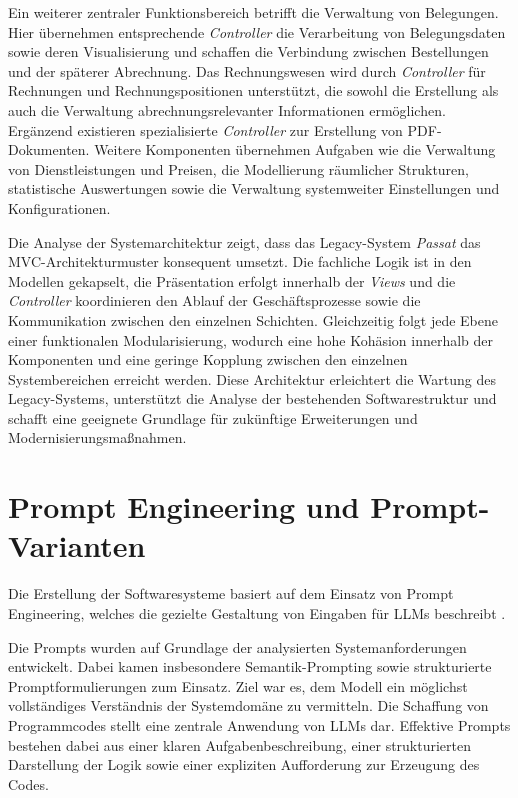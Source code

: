 Ein weiterer zentraler Funktionsbereich betrifft die Verwaltung von Belegungen. Hier übernehmen entsprechende \textit{Controller} die Verarbeitung von Belegungsdaten sowie deren Visualisierung und schaffen die Verbindung zwischen Bestellungen und der späterer Abrechnung. Das Rechnungswesen wird durch \textit{Controller} für Rechnungen und Rechnungspositionen unterstützt, die sowohl die Erstellung als auch die Verwaltung abrechnungsrelevanter Informationen ermöglichen. Ergänzend existieren spezialisierte \textit{Controller} zur Erstellung von PDF-Dokumenten. Weitere Komponenten übernehmen Aufgaben wie die Verwaltung von Dienstleistungen und Preisen, die Modellierung räumlicher Strukturen, statistische Auswertungen sowie die Verwaltung systemweiter Einstellungen und Konfigurationen.

Die Analyse der Systemarchitektur zeigt, dass das Legacy-System \textit{Passat} das MVC-Architekturmuster konsequent umsetzt. Die fachliche Logik ist in den Modellen gekapselt, die Präsentation erfolgt innerhalb der \textit{Views} und die \textit{Controller} koordinieren den Ablauf der Geschäftsprozesse sowie die Kommunikation zwischen den einzelnen Schichten. Gleichzeitig folgt jede Ebene einer funktionalen Modularisierung, wodurch eine hohe Kohäsion innerhalb der Komponenten und eine geringe Kopplung zwischen den einzelnen Systembereichen erreicht werden. Diese Architektur erleichtert die Wartung des Legacy-Systems, unterstützt die Analyse der bestehenden Softwarestruktur und schafft eine geeignete Grundlage für zukünftige Erweiterungen und Modernisierungsmaßnahmen.

\section{Prompt Engineering und Prompt-Varianten}

Die Erstellung der Softwaresysteme basiert auf dem
Einsatz von Prompt Engineering, welches die gezielte
Gestaltung von Eingaben für LLMs
beschreibt \cite{boonstra2024prompt}.

Die Prompts wurden auf Grundlage der analysierten
Systemanforderungen entwickelt. Dabei kamen insbesondere
Semantik-Prompting sowie strukturierte
Promptformulierungen zum Einsatz. Ziel war es, dem Modell
ein möglichst vollständiges Verständnis der Systemdomäne
zu vermitteln.
Die Schaffung von Programmcodes stellt eine zentrale
Anwendung von LLMs dar. Effektive Prompts bestehen dabei
aus einer klaren Aufgabenbeschreibung, einer strukturierten
Darstellung der Logik sowie einer expliziten Aufforderung
zur Erzeugung des Codes.

